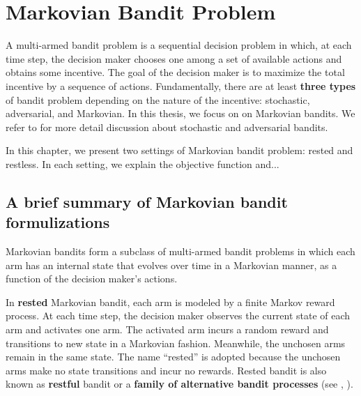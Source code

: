 \begingroup
\let\clearpage\relax

\chapter{Markovian Bandit Problem}
\label{ch:mb}

A multi-armed bandit problem is a sequential decision problem in which, at each time step, the decision maker chooses one among a set of available actions and obtains some incentive.
The goal of the decision maker is to maximize the total incentive by a sequence of actions.
Fundamentally, there are at least \textbf{three types} of bandit problem depending on the nature of the incentive: stochastic, adversarial, and Markovian.
In this thesis, we focus on on Markovian bandits.
We refer to \cite{bubeck2012regret} for more detail discussion about stochastic and adversarial bandits.

In this chapter, we present two settings of Markovian bandit problem: rested and restless.
In each setting, we explain the objective function and...

\section{A brief summary of Markovian bandit formulizations}

Markovian bandits form a subclass of multi-armed bandit problems in which each arm has an internal state that evolves over time in a Markovian manner, as a function of the decision maker’s actions.

In \textbf{rested} Markovian bandit, each arm is modeled by a finite Markov reward process. At each time step, the decision maker observes the current state of each arm and activates one arm.
The activated arm incurs a random reward and transitions to new state in a Markovian fashion.
Meanwhile, the unchosen arms remain in the same state.
The name ``rested'' is adopted because the unchosen arms make no state transitions and incur no rewards.
Rested bandit is also known as \textbf{restful} bandit or a \textbf{family of alternative bandit processes} (see \eg, \cite{gittins1979bandit,katehakis1987multi,duff1995q,tekin2010online,gittins2011multi}).

